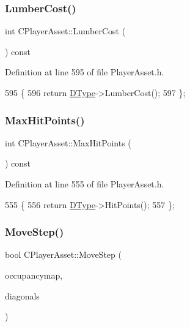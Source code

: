\subsubsection{\texorpdfstring{Lumber\+Cost()}{LumberCost()}}
{\footnotesize\ttfamily int C\+Player\+Asset\+::\+Lumber\+Cost (\begin{DoxyParamCaption}{ }\end{DoxyParamCaption}) const\hspace{0.3cm}{\ttfamily [inline]}}



Definition at line 595 of file Player\+Asset.\+h.


\begin{DoxyCode}
595                               \{
596             \textcolor{keywordflow}{return} \hyperlink{classCPlayerAsset_a5d61f73471e1e6f0a6ab15f2ffa7b359}{DType}->LumberCost(); 
597         \};
\end{DoxyCode}
\hypertarget{classCPlayerAsset_a119a30dbc2a8e4369b9525aca812618c}{}\label{classCPlayerAsset_a119a30dbc2a8e4369b9525aca812618c} 
\subsubsection{\texorpdfstring{Max\+Hit\+Points()}{MaxHitPoints()}}
{\footnotesize\ttfamily int C\+Player\+Asset\+::\+Max\+Hit\+Points (\begin{DoxyParamCaption}{ }\end{DoxyParamCaption}) const\hspace{0.3cm}{\ttfamily [inline]}}



Definition at line 555 of file Player\+Asset.\+h.


\begin{DoxyCode}
555                                 \{
556             \textcolor{keywordflow}{return} \hyperlink{classCPlayerAsset_a5d61f73471e1e6f0a6ab15f2ffa7b359}{DType}->HitPoints();
557         \};
\end{DoxyCode}
\hypertarget{classCPlayerAsset_a4c8ef6c0049b48045c2ba95d398dbc05}{}\label{classCPlayerAsset_a4c8ef6c0049b48045c2ba95d398dbc05} 
\subsubsection{\texorpdfstring{Move\+Step()}{MoveStep()}}
{\footnotesize\ttfamily bool C\+Player\+Asset\+::\+Move\+Step (\begin{DoxyParamCaption}\item[{std\+::vector$<$ std\+::vector$<$ std\+::shared\+\_\+ptr$<$ \hyperlink{classCPlayerAsset}{C\+Player\+Asset} $>$ $>$ $>$ \&}]{occupancymap,  }\item[{std\+::vector$<$ std\+::vector$<$ bool $>$ $>$ \&}]{diagonals }\end{DoxyParamCaption})}



